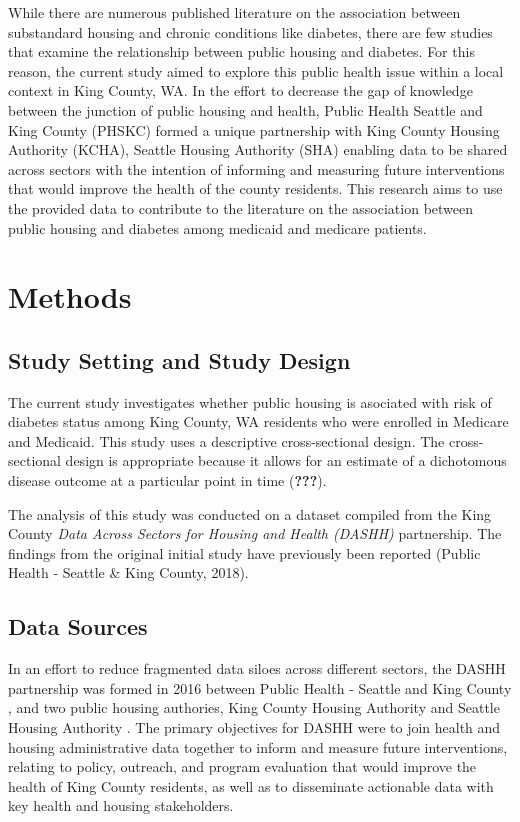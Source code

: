 \documentclass [11pt, proquest] {uwthesis}[2015/03/03]
\begin{document}
While there are numerous published literature on the association between
substandard housing and chronic conditions like diabetes, there are few
studies that examine the relationship between public housing and
diabetes. For this reason, the current study aimed to explore this
public health issue within a local context in King County, WA. In the
effort to decrease the gap of knowledge between the junction of public
housing and health, Public Health Seattle and King County (PHSKC) formed
a unique partnership with King County Housing Authority (KCHA), Seattle
Housing Authority (SHA) enabling data to be shared across sectors with
the intention of informing and measuring future interventions that would
improve the health of the county residents. This research aims to use
the provided data to contribute to the literature on the association
between public housing and diabetes among medicaid and medicare
patients.

\chapter{Methods}\label{math-sci}

\section{Study Setting and Study
Design}\label{study-setting-and-study-design}

The current study investigates whether public housing is asociated with
risk of diabetes status among King County, WA residents who were
enrolled in Medicare and Medicaid. This study uses a descriptive
cross-sectional design. The cross-sectional design is appropriate
because it allows for an estimate of a dichotomous disease outcome at a
particular point in time ({\textbf{???}}).

The analysis of this study was conducted on a dataset compiled from the
King County \emph{Data Across Sectors for Housing and Health (DASHH)}
partnership. The findings from the original initial study have
previously been reported (Public Health - Seattle \& King County, 2018).

\section{Data Sources}\label{data-sources}

In an effort to reduce fragmented data siloes across different sectors,
the DASHH partnership was formed in 2016 between Public Health - Seattle
and King County , and two public housing authories, King County Housing
Authority and Seattle Housing Authority . The primary objectives for
DASHH were to join health and housing administrative data together to
inform and measure future interventions, relating to policy, outreach,
and program evaluation that would improve the health of King County
residents, as well as to disseminate actionable data with key health and
housing stakeholders.
\end{document}
